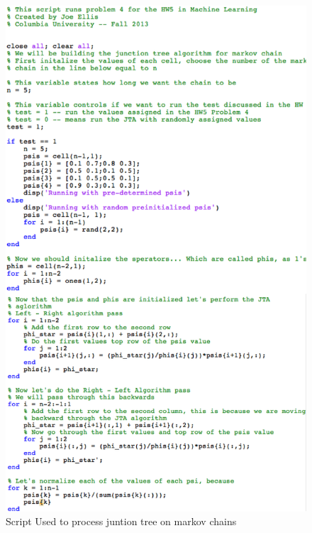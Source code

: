 \documentclass[paper=a4, fontsize=11pt]{scrartcl} %
\begin{document}
\begin{figure}
\centering
\includegraphics[width=1\textwidth]{Problem3/Problem4_script.png}
\caption{Script Used to process juntion tree on markov chains}
\label{fig:script}
\end{figure}
\end{document}
